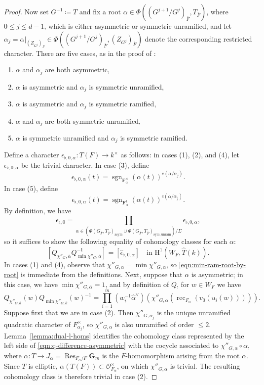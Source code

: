 \documentclass[reqno]{amsart}
\numberwithin{equation}{subsection}
\newcommand{\F}{\mathbf{F}}
\newcommand{\G}{\mathbf{G}}
\newcommand{\sgn}{\operatorname{sgn}}
\newcommand{\ol}[1]{\overline{#1}}
\newcommand{\wh}[1]{\widehat{#1}}
\newcommand{\co}{\colon}
\newcommand\cO{\mathcal{O}}
\DeclareMathOperator{\Res}{Res}
\DeclareMathOperator{\rec}{rec}
\newcommand{\rH}{\ensuremath{\mathrm{H}}\xspace}
\theoremstyle{remark}
\numberwithin{equation}{subsection}
\numberwithin{figure}{subsection}
\begin{document}
\begin{proof}
Now set $G^{-1} \coloneqq T$ and fix a root $\alpha \in \Phi((G^{j+1}/G^j)_{\ol F}, T_{\ol F})$, where $0 \leq j \leq d-1$, which is either asymmetric or symmetric unramified, and let $\alpha_j = \alpha|_{(Z_{G^j})_{\ol F}} \in \Phi((G^{j+1}/G^j)_{\ol F}, (Z_{G^j})_{\ol F})$ denote the corresponding restricted character. There are five cases, as in the proof of \cite[Proposition 5.27]{Kal21a}:
\begin{enumerate}
    \item $\alpha$ and $\alpha_j$ are both asymmetric,
    \item $\alpha$ is asymmetric and $\alpha_j$ is symmetric unramified,
    \item $\alpha$ is asymmetric and $\alpha_j$ is symmetric ramified,
    \item $\alpha$ and $\alpha_j$ are both symmetric unramified,
    \item $\alpha$ is symmetric unramified and $\alpha_j$ is symmetric ramified.
\end{enumerate}
Define a character $\epsilon_{\flat,0,\alpha}\co T(F) \to k^\times$ as follows: in cases (1), (2), and (4), let $\epsilon_{\flat,0,\alpha}$ be the trivial character. In case (3), define
\[
\epsilon_{\flat,0,\alpha}(t) = \sgn_{\F_\alpha^\times}(\alpha(t))^{e(\alpha/\alpha_j)}.
\]
In case (5), define
\[
\epsilon_{\flat,0,\alpha}(t) = \sgn_{\F_\alpha^1}(\alpha(t))^{e(\alpha/\alpha_j)}.
\]
By definition, we have
\[
\epsilon_{\flat,0} = \prod_{\alpha \in (\Phi(G_{\ol F},T_{\ol F})_{\mathrm{asym}}\cup \Phi(G_{\ol F},T_{\ol F})_{\mathrm{sym,unram}})/\Sigma} \epsilon_{\flat,0,\alpha},
\]
so it suffices to show the following equality of cohomology classes for each $\alpha$:
\begin{equation}\label{eqn:min-ram-root-by-root}
[Q_{\chi''_G,\ol\alpha}Q_{\min\chi''_G,\ol\alpha}^{-1}]=[\wh\epsilon_{\flat,0,\alpha}]\quad\text{in }\rH^1(W_F, \wh T(k)).
\end{equation}
In cases (1) and (4), observe that $\chi''_{G,\alpha} = \min \chi''_{G,\alpha}$, so \eqref{eqn:min-ram-root-by-root} is immediate from the definitions. Next, suppose that $\alpha$ is asymmetric; in this case, we have $\min\chi''_{G,\ol\alpha} = 1$, and by definition of $Q$, for $w \in W_F$ we have
\begin{equation}\label{eqn:q-difference-asymmetric}
Q_{\chi''_{G,\ol\alpha}}(w)Q_{\min\chi''_{G,\ol\alpha}}(w)^{-1} = \prod_{i=1}^m (w_i^{-1}\wh\alpha^\vee)(\chi''_{G,\alpha}(\rec_{F_\alpha}(v_0(u_i(w))))).
\end{equation}
Suppose first that we are in case (2). Then $\chi''_{G,\alpha_j}$ is the unique unramified quadratic character of $F_{\alpha_j}^\times$, so $\chi''_{G,\alpha}$ is also unramified of order $\leq 2$. Lemma~\ref{lemma:dual-l-homs} identifies the cohomology class represented by the left side of \eqref{eqn:q-difference-asymmetric} with the cocycle associated to $\chi''_{G,\alpha}\circ\alpha$, where $\alpha\co T\to J_\alpha=\Res_{F_\alpha/F}\G_m$ is the $F$-homomorphism arising from the root $\alpha$. Since $T$ is elliptic, $\alpha(T(F))\subset\cO_{F_\alpha}^\times$, on which $\chi''_{G,\alpha}$ is trivial. The resulting cohomology class is therefore trivial in case (2).


\end{proof}
\end{document}
